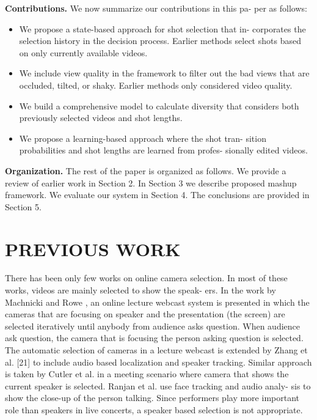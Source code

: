 \documentclass{sig-alternate}
\begin{document}
\textbf{Contributions.} We now summarize our contributions in this pa-
per as follows:
\begin{itemize}
    \item We propose a state-based approach for shot selection that in-
corporates the selection history in the decision process. Earlier methods select shots based on only currently available
videos.
\item We include view quality in the framework to filter out the
bad views that are occluded, tilted, or shaky. Earlier methods
only considered video quality.
\item We build a comprehensive model to calculate diversity that
considers both previously selected videos and shot lengths.
\item We propose a learning-based approach where the shot tran-
sition probabilities and shot lengths are learned from profes-
sionally edited videos.

\end{itemize}
\textbf{Organization.} The rest of the paper is organized as follows.
We provide a review of earlier work in Section 2. In Section 3 we
describe proposed mashup framework. We evaluate our system in
Section 4. The conclusions are provided in Section 5.


\section{PREVIOUS WORK}
There has been only few works on online camera selection. In
most of these works, videos are mainly selected to show the speak-
ers. In the work by Machnicki and Rowe \cite{9}, an online lecture
webcast system is presented in which the cameras that are focusing
on speaker and the presentation (the screen) are selected iteratively
until anybody from audience asks question. When audience ask
question, the camera that is focusing the person asking question is
selected. The automatic selection of cameras in a lecture webcast
is extended by Zhang et al. [21] to include audio based localization
and speaker tracking. Similar approach is taken by Cutler et al. \cite{6}
in a meeting scenario where camera that shows the current speaker
is selected. Ranjan et al. \cite{12} use face tracking and audio analy-
sis to show the close-up of the person talking. Since performers
play more important role than speakers in live concerts, a speaker
based selection is not appropriate. 
\end{document}
